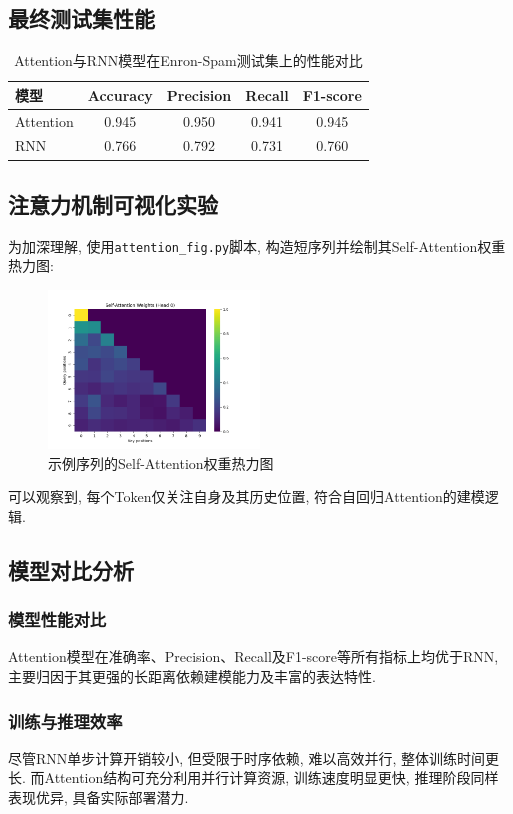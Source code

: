 \documentclass[11pt]{article}
\begin{document}
\subsection{最终测试集性能}
\begin{table}[htbp]
\centering
\begin{tabular}{lcccc}
\toprule
模型 & Accuracy & Precision & Recall & F1-score \\
\midrule
Attention & 0.945 & 0.950 & 0.941 & 0.945 \\
RNN       & 0.766 & 0.792 & 0.731 & 0.760 \\
\bottomrule
\end{tabular}
\caption{Attention与RNN模型在Enron-Spam测试集上的性能对比}
\end{table}

\subsection{注意力机制可视化实验}
为加深理解, 使用\texttt{attention\_fig.py}脚本, 构造短序列并绘制其Self-Attention权重热力图:
\begin{figure}[htbp]
	\centering
	\includegraphics[width=0.5\textwidth]{../../result/attention_map.png}
	\caption{示例序列的Self-Attention权重热力图}
\end{figure}
可以观察到, 每个Token仅关注自身及其历史位置, 符合自回归Attention的建模逻辑.

\subsection{模型对比分析}
\subsubsection{模型性能对比}
Attention模型在准确率、Precision、Recall及F1-score等所有指标上均优于RNN, 主要归因于其更强的长距离依赖建模能力及丰富的表达特性.

\subsubsection{训练与推理效率}
尽管RNN单步计算开销较小, 但受限于时序依赖, 难以高效并行, 整体训练时间更长. 而Attention结构可充分利用并行计算资源, 训练速度明显更快, 推理阶段同样表现优异, 具备实际部署潜力.
\end{document}
